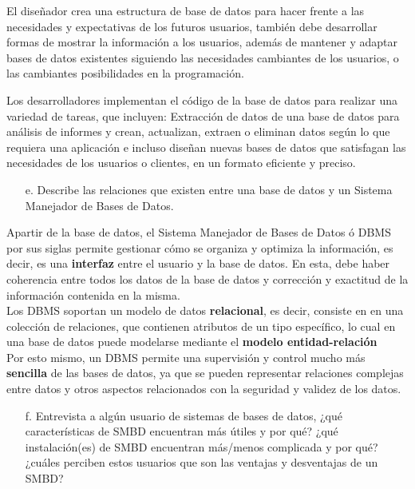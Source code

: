 \documentclass{article}
\begin{document}
\begin{enumerate}
    El diseñador crea una estructura de base de datos para hacer frente a las necesidades y expectativas de los futuros usuarios, también debe desarrollar formas de mostrar la información a los usuarios, además de mantener y adaptar bases de datos existentes siguiendo las necesidades cambiantes de los usuarios, o las cambiantes posibilidades en la programación. 

    Los desarrolladores implementan el código de la base de datos para realizar una variedad de tareas, que incluyen: Extracción de datos de una base de datos para análisis de informes y crean, actualizan, extraen o eliminan datos según lo que requiera una aplicación e incluso diseñan nuevas bases de datos que satisfagan las necesidades de los usuarios o clientes, en un formato eficiente y preciso.
    
\begin{itemize}
    \item[e.]Describe las relaciones que existen entre una base de datos y un Sistema Manejador de Bases de Datos.
    \end{itemize}
Apartir de la base de datos, el Sistema Manejador de Bases de Datos ó DBMS por sus siglas permite gestionar cómo se organiza y optimiza la información, es decir, es una \textbf{interfaz} entre el usuario y la base de datos. En esta, debe haber coherencia entre todos los datos de la base de datos y corrección y exactitud de la información contenida en la misma. \\
Los DBMS soportan un modelo de datos \textbf{relacional}, es decir, consiste en en una colección de relaciones, que contienen atributos de un tipo específico, lo cual en una base de datos puede modelarse mediante el \textbf{modelo entidad-relación}\\
Por esto mismo, un DBMS permite una supervisión y control mucho más \textbf{sencilla} de las bases de datos, ya que se pueden
 representar relaciones complejas entre datos y otros aspectos relacionados con la seguridad y validez de los datos. \\
 
\begin{itemize}
    \item[f.]Entrevista a algún usuario de sistemas de bases de datos, ¿qué características de SMBD encuentran más útiles y por qué? ¿qué instalación(es) de SMBD encuentran más/menos complicada y por qué? ¿cuáles perciben estos usuarios que son las ventajas y desventajas de un SMBD?
    \end{itemize}
    

\end{enumerate}
\end{document}
